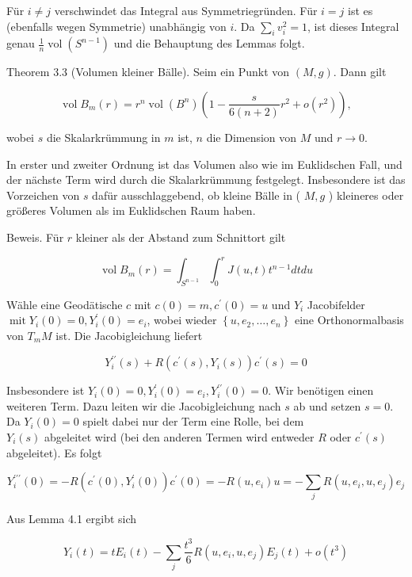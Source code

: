 \documentclass[10pt, letterpaper]{article}
\begin{document}
Für $i \neq j$ verschwindet das Integral aus Symmetriegründen. Für $i=j$ ist es (ebenfalls wegen Symmetrie) unabhängig von $i$. Da $\sum_{i} v_{i}^{2}=1$, ist dieses Integral genau $\frac{1}{n} \operatorname{vol}\left(S^{n-1}\right)$ und die Behauptung des Lemmas folgt.

Theorem 3.3 (Volumen kleiner Bälle). Seim ein Punkt von $(M, g)$. Dann gilt

$$
\operatorname{vol} B_{m}(r)=r^{n} \operatorname{vol}\left(B^{n}\right)\left(1-\frac{s}{6(n+2)} r^{2}+o\left(r^{2}\right)\right),
$$

wobei $s$ die Skalarkrümmung in $m$ ist, $n$ die Dimension von $M$ und $r \rightarrow 0$.

In erster und zweiter Ordnung ist das Volumen also wie im Euklidschen Fall, und der nächste Term wird durch die Skalarkrümmung festgelegt. Insbesondere ist das Vorzeichen von $s$ dafür ausschlaggebend, ob kleine Bälle in ( $M, g$ ) kleineres oder größeres Volumen als im Euklidschen Raum haben.

Beweis. Für $r$ kleiner als der Abstand zum Schnittort gilt

$$
\operatorname{vol} B_{m}(r)=\int_{S^{n-1}} \int_{0}^{r} J(u, t) t^{n-1} d t d u
$$

Wähle eine Geodätische $c$ mit $c(0)=m, c^{\prime}(0)=u$ und $Y_{i}$ Jacobifelder $\operatorname{mit} Y_{i}(0)=0, Y_{i}^{\prime}(0)=e_{i}$, wobei wieder $\left\{u, e_{2}, \ldots, e_{n}\right\}$ eine Orthonormalbasis von $T_{m} M$ ist. Die Jacobigleichung liefert

$$
Y_{i}^{\prime \prime}(s)+R\left(c^{\prime}(s), Y_{i}(s)\right) c^{\prime}(s)=0
$$

Insbesondere ist $Y_{i}(0)=0, Y_{i}^{\prime}(0)=e_{i}, Y_{i}^{\prime \prime}(0)=0$. Wir benötigen einen weiteren Term. Dazu leiten wir die Jacobigleichung nach $s$ ab und setzen $s=0$. Da $Y_{i}(0)=0$ spielt dabei nur der Term eine Rolle, bei dem\\
$Y_{i}(s)$ abgeleitet wird (bei den anderen Termen wird entweder $R$ oder $c^{\prime}(s)$ abgeleitet). Es folgt

$$
Y_{i}^{\prime \prime \prime}(0)=-R\left(c^{\prime}(0), Y_{i}^{\prime}(0)\right) c^{\prime}(0)=-R\left(u, e_{i}\right) u=-\sum_{j} R\left(u, e_{i}, u, e_{j}\right) e_{j}
$$

Aus Lemma 4.1 ergibt sich

$$
Y_{i}(t)=t E_{i}(t)-\sum_{j} \frac{t^{3}}{6} R\left(u, e_{i}, u, e_{j}\right) E_{j}(t)+o\left(t^{3}\right)
$$
\end{document}
